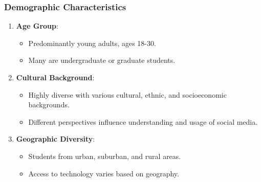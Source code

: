 \documentclass{beamer}
\begin{document}
\begin{frame}[fragile]
    \frametitle{Demographic Characteristics}
    \begin{enumerate}
        \item \textbf{Age Group}:
        \begin{itemize}
            \item Predominantly young adults, ages 18-30.
            \item Many are undergraduate or graduate students.
        \end{itemize}
        \item \textbf{Cultural Background}:
        \begin{itemize}
            \item Highly diverse with various cultural, ethnic, and socioeconomic backgrounds.
            \item Different perspectives influence understanding and usage of social media.
        \end{itemize}
        \item \textbf{Geographic Diversity}:
        \begin{itemize}
            \item Students from urban, suburban, and rural areas.
            \item Access to technology varies based on geography.
        \end{itemize}
    \end{enumerate}
\end{frame}
\end{document}
